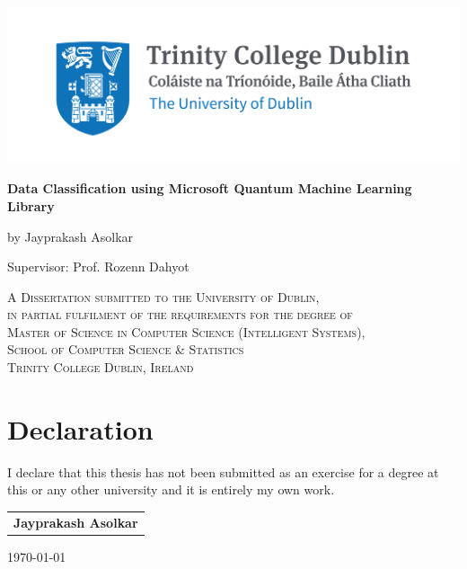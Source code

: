 \documentclass[english,a4paper,11pt,oneside,onecolumn]{book}
\begin{document}
\renewcommand{\footrulewidth}{1pt}

\begin{titlepage}
	\centering
	
\includegraphics[width=.8\linewidth]{Images/trinity-common-use.jpg}\par\vspace{2cm}
%
	\vspace{2cm}
	{\huge\bfseries Data Classification using Microsoft Quantum Machine Learning Library\par}
	\vspace{1cm}
	{\scshape \par}
	\vspace{2cm}
	{\Large by Jayprakash Asolkar \par}
	{\Large Supervisor: Prof. Rozenn Dahyot \par}
 \vspace{1cm}
{\scshape 
A Dissertation submitted to the University of Dublin,\\
in partial fulfilment of the requirements for the degree of\\
Master of Science in Computer Science (Intelligent Systems),\\
School of Computer Science \& Statistics\\ 
Trinity College Dublin, Ireland\\
}
\end{titlepage}

\clearpage

\frontmatter
{}
\chapter*{Declaration}

I declare that this thesis has not been submitted as an exercise for a degree at this or
any other university and it is entirely my own work.


\vspace{3cm}
\begin{flushright}

\begin{tabular}{l}
\hline
\textbf{\textsf{\large Jayprakash Asolkar}}\\
\end{tabular}

\vspace{0.5cm}

\today
\end{flushright}
\end{document}

